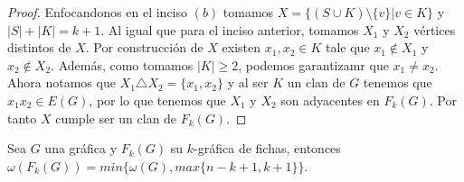 \begin{proof}
        Enfocandonos en el inciso $(b)$ tomamos $X = \{(S\cup K) \setminus
        \{v\}| v \in K \}$ y $|S| + |K| = k+1$. Al igual que para el inciso
        anterior, tomamos $X_1$ y $X_2$ v\'ertices distintos de $X$. Por
        construcci\'on de $X$ existen $x_1, x_2 \in K$ tale que $x_1 \notin X_1$
        y $x_2 \notin X_2$. Adem\'as, como tomamos $|K| \geq 2$, podemos
        garantizamr que $x_1 \neq x_2$. Ahora notamos que $X_1 \triangle X_2 =
        \{x_1, x_2\}$ y al ser $K$ un clan de $G$ tenemos que $x_1x_2 \in E(G)$,
        por lo que tenemos que $X_1$ y $X_2$ son adyacentes en $F_k(G)$. Por
        tanto $X$ cumple ser un clan de $F_k(G)$.
    \end{proof}

    \begin{teorema}
        \label{teo:clan maximo}
        Sea $G$ una gr\'afica y $F_k(G)$ su $k$-gr\'afica de fichas, entonces
        $\omega(F_k(G))= min \{\omega(G), max \{n-k+1,k+1\}\}$.
    \end{teorema}

